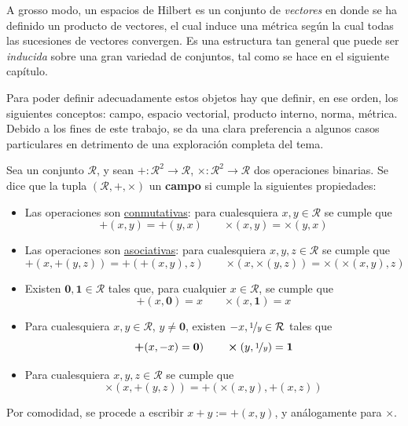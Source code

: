 A grosso modo, un espacios de Hilbert es un conjunto de \textit{vectores} en donde se ha definido un producto de vectores, el cual induce una métrica según la cual todas las sucesiones de vectores convergen.
%
Es una estructura tan general que puede ser \textit{inducida} sobre una gran variedad de conjuntos, tal como se hace en el siguiente capítulo.

Para poder definir adecuadamente estos objetos hay que definir, en ese orden, los siguientes conceptos: campo, espacio vectorial, producto interno, norma, métrica.
%
Debido a los fines de este trabajo, se da una clara preferencia a algunos casos particulares en detrimento de una exploración completa del tema.

\begin{definicion}
Sea un conjunto $\mathcal{R}$, y sean $\boldsymbol{+} : \mathcal{R}^{2} \rightarrow \mathcal{R}$, $\boldsymbol{\times} : \mathcal{R}^{2} \rightarrow \mathcal{R}$ dos operaciones binarias. 
%
Se dice que la tupla $(\mathcal{R},\boldsymbol{+},\boldsymbol{\times})$ un \textbf{campo} si cumple la siguientes propiedades:
\begin{itemize}
\item Las operaciones son \ul{conmutativas}: para cualesquiera $x, y \in \mathcal{R}$ se cumple que 
\begin{equation*}
\boldsymbol{+}(x,y) = \boldsymbol{+}(y,x) \qquad \boldsymbol{\times}(x,y) = \boldsymbol{\times}(y,x)
\end{equation*}
\item Las operaciones son \ul{asociativas}: para cualesquiera $x, y, z \in \mathcal{R}$ se cumple que 
\begin{equation*}
\boldsymbol{+}(x,\boldsymbol{+}(y,z)) = \boldsymbol{+}(\boldsymbol{+}(x,y),z) \qquad \boldsymbol{\times}(x,\boldsymbol{\times}(y,z)) = \boldsymbol{\times}(\boldsymbol{\times}(x,y),z)
\end{equation*}
\item Existen $\boldsymbol{0}, \boldsymbol{1} \in \mathcal{R}$ tales que, para cualquier $x \in \mathcal{R}$, se cumple que
\begin{equation*}
\boldsymbol{+}(x,\boldsymbol{0}) = x \qquad \boldsymbol{\times}(x,\boldsymbol{1}) = x
\end{equation*}
\item Para cualesquiera $x, y \in \mathcal{R}$, $y \neq \boldsymbol{0}$, existen $-x, \nicefrac{1}{y} \in \mathcal{R}$ tales que
\begin{equation*}
\boldsymbol{+}(x,-x)=\boldsymbol{0}) \qquad \boldsymbol{\times}(y,\nicefrac{1}{y}) = \boldsymbol{1}
\end{equation*}
\item Para cualesquiera $x, y, z \in \mathcal{R}$ se cumple que 
\begin{equation*}
\boldsymbol{\times}(x, \boldsymbol{+}(y,z)) = \boldsymbol{+}( \boldsymbol{\times}(x,y), \boldsymbol{+}(x,z) )
\end{equation*}
\end{itemize}
Por comodidad, se procede a escribir $x+y := \boldsymbol{+}(x,y)$, y análogamente para $\boldsymbol{\times}$.
\end{definicion}


